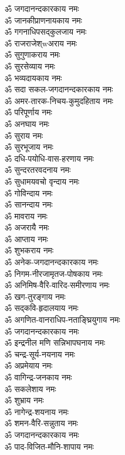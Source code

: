 \begin{flushleft}
\begin{multicols}{2}
ॐ जगदानन्दकारकाय नमः\\
ॐ जानकीप्राणनायकाय नमः\\
ॐ गगनाधिपसद्कुलजाय नमः\\
ॐ राजराजेश्wअराय नमः\\
ॐ सुगुणाकराय नमः\\
ॐ सुरसेव्याय नमः\\
ॐ भव्यदायकाय नमः\\
ॐ सदा सकल-जगदानन्दकारकाय नमः\\
ॐ अमर-तारक-निचय-कुमुदहिताय  नमः\\
ॐ परिपूर्णाय नमः\hfill{}\\
ॐ अनघाय नमः\\
ॐ सुराय नमः\\
ॐ सुरभूजाय  नमः\\
ॐ दधि-पयोधि-वास-हरणाय नमः\\
ॐ सुन्दरतरवदनाय नमः\\
ॐ सुधामयवचो वृन्दाय नमः\\
ॐ गोविन्दाय नमः\\
ॐ सानन्दाय नमः\\
ॐ मावराय नमः\\
ॐ अजरायै नमः\hfill{}\\
ॐ आप्ताय नमः\\
ॐ शुभकराय नमः\\
ॐ अनेक-जगदानन्दकारकाय नमः\\
ॐ निगम-नीरजामृतज-पोषकाय नमः\\
ॐ अनिमिष-वैरि-वारिद-समीरणाय नमः\\
ॐ खग-तुरङ्गाय नमः\\
ॐ सद्कवि-हृदालयाय नमः\\
ॐ अगणित-वानराधिप-नताङ्घ्रियुगाय नमः\\
ॐ जगदानन्दकारकाय नमः\\
ॐ इन्द्रनील मणि सन्निभापघनाय नमः\hfill{}\\
ॐ चन्द्र-सूर्य-नयनाय नमः\\
ॐ अप्रमेयाय नमः\\
ॐ वागिन्द्र-जनकाय नमः\\
ॐ सकलेशाय नमः\\
ॐ शुभ्राय नमः\\
ॐ नागेन्द्र-शयनाय नमः\\
ॐ शमन-वैरि-सन्नुताय नमः\\
ॐ जगदानन्दकारकाय नमः\\
ॐ पाद-विजित-मौनि-शापाय  नमः\\

\end{multicols}
\end{flushleft}

